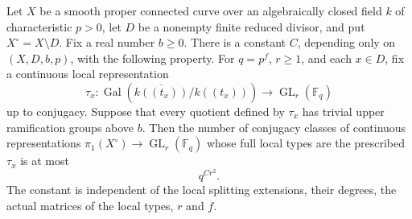 \begin{theorem}
\label{D:curve-fixed-local-linear-growth}
Let $X$ be a smooth proper connected curve over an algebraically
closed field $k$ of characteristic $p>0$, let $D$ be a nonempty
finite reduced divisor, and put $X^\circ=X\setminus D$.
Fix a real number $b\geq0$. There is a constant $C$, depending
only on $(X,D,b,p)$, with the following property.
For $q=p^f$, $r\geq1$, and each $x\in D$, fix a continuous
local representation
\[
 \tau_x:\operatorname{Gal}(\overline{k((t_x))}/k((t_x)))
                  \longrightarrow\operatorname{GL}_r(\mathbb F_q)
\]
up to conjugacy. Suppose that every quotient defined by $\tau_x$
has trivial upper ramification groups above $b$.
Then the number of conjugacy classes of continuous representations
$\pi_1(X^\circ)\to\operatorname{GL}_r(\mathbb F_q)$ whose full
local types are the prescribed $\tau_x$ is at most
\[
                              q^{Cr^2}.
 \tag{D.CL.4}
\]
The constant is independent of the local splitting extensions,
their degrees, the actual matrices of the local types, $r$ and $f$.
\end{theorem}

